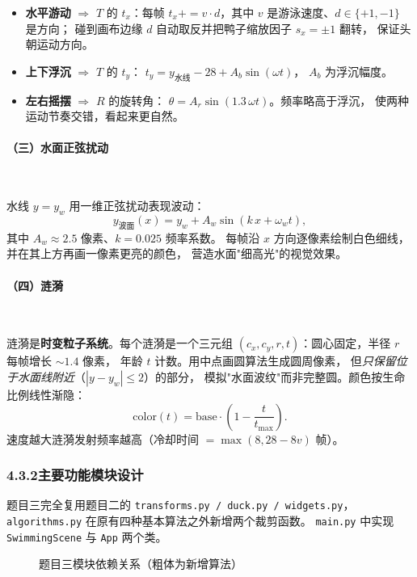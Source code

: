 \documentclass[12pt, a4paper]{article}
\begin{document}
\begin{itemize}[leftmargin=*]
    \item \textbf{水平游动} $\Rightarrow$ $T$ 的 $t_x$：每帧
    $t_x \mathrel{+{=}} v \cdot d$，其中 $v$ 是游泳速度、$d \in \{+1, -1\}$ 是方向；
    碰到画布边缘 $d$ 自动取反并把鸭子缩放因子 $s_x = \pm 1$ 翻转，
    保证头朝运动方向。
    \item \textbf{上下浮沉} $\Rightarrow$ $T$ 的 $t_y$：
    $t_y = y_{\text{水线}} - 28 + A_b \sin(\omega t)$，
    $A_b$ 为浮沉幅度。
    \item \textbf{左右摇摆} $\Rightarrow$ $R$ 的旋转角：
    $\theta = A_r \sin(1.3\, \omega t)$。频率略高于浮沉，
    使两种运动节奏交错，看起来更自然。
\end{itemize}

\paragraph{（三）水面正弦扰动}~

水线 $y = y_w$ 用一维正弦扰动表现波动：
\[
y_{\text{波面}}(x) = y_w + A_w \sin(k\,x + \omega_w t),
\]
其中 $A_w \approx 2.5$ 像素、$k = 0.025$ 频率系数。
每帧沿 $x$ 方向逐像素绘制白色细线，并在其上方再画一像素更亮的颜色，
营造水面"细高光"的视觉效果。

\paragraph{（四）涟漪}~

涟漪是\textbf{时变粒子系统}。每个涟漪是一个三元组
$(c_x, c_y, r, t)$：圆心固定，半径 $r$ 每帧增长 $\sim 1.4$ 像素，
年龄 $t$ 计数。用中点画圆算法生成圆周像素，
但\textit{只保留位于水面线附近}（$|y - y_w| \le 2$）的部分，
模拟"水面波纹"而非完整圆。颜色按生命比例线性渐隐：
\[
\mathrm{color}(t) = \mathrm{base} \cdot \left(1 - \frac{t}{t_{\max}}\right).
\]
速度越大涟漪发射频率越高（冷却时间 $= \max(8, 28 - 8v)$ 帧）。

\subsubsection*{4.3.2\quad 主要功能模块设计}

题目三完全复用题目二的 \texttt{transforms.py / duck.py / widgets.py}，
\texttt{algorithms.py} 在原有四种基本算法之外新增两个裁剪函数。
\texttt{main.py} 中实现 \texttt{SwimmingScene} 与 \texttt{App} 两个类。

\begin{figure}[H]
\centering
{}
\caption{题目三模块依赖关系（粗体为新增算法）}
\label{fig:module-swim}
\end{figure}
\end{document}
